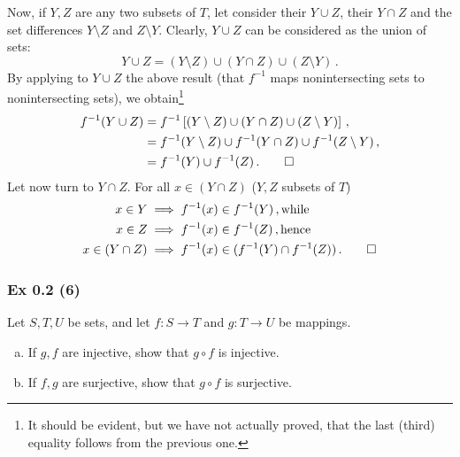 {Now, if $Y, Z$ are any two subsets of $T$, let consider their  $Y \cup Z$, their  $Y \cap Z$ and the set differences $Y\setminus Z$ and $Z\setminus Y$. Clearly, $Y \cup Z$ can be considered as the union of   sets: 
$$ Y \cup Z = (Y\setminus Z) \cup (Y \cap Z) \cup (Z\setminus Y)\,.$$
By applying  to $ Y\cup Z$ the above result (that $f^{-1}$ maps nonintersecting sets to nonintersecting sets), we obtain\footnote{It should be evident, but we have not actually proved, that the last (third) equality follows from the previous one.}
\begin{align*}
f^{-1}(Y \cup Z) &= f^{-1}\left[ (Y\setminus Z) \cup (Y \cap Z) \cup (Z\setminus Y) \right] \,,\\
                 &= f^{-1}(Y\setminus Z) \cup f^{-1}(Y \cap Z) \cup f^{-1}(Z \setminus Y)\,, \\
                 &= f^{-1}(Y) \cup f^{-1}(Z)\,. \qed\\
\end{align*}
Let now turn to $ Y\cap Z$.  For all $x \in (Y \cap Z)$  ($Y, Z$ subsets of $T$)
\begin{align*}
x \in Y &\implies f^{-1}(x) \in f^{-1}(Y)\,, \text{while}\\
x \in Z &\implies f^{-1}(x) \in f^{-1}(Z)\,, \text{hence}\\
x \in (Y\cap Z) &\implies f^{-1}(x) \in (f^{-1}(Y) \cap f^{-1}(Z))\,. \qed 
\end{align*}

}	%


\subsubsection{Ex 0.2 (6)}\label{sec:Ex_0.2.6}
Let $S, T, U$ be sets, and let $f : S \rightarrow T$ and $g : T \rightarrow U$ be mappings.
\begin{enumerate}[(a)]
\item If $g, f$ are injective, show that $g \circ f$ is injective. 
\item If $f, g$ are surjective, show that $g \circ f$ is surjective.
\end{enumerate}
